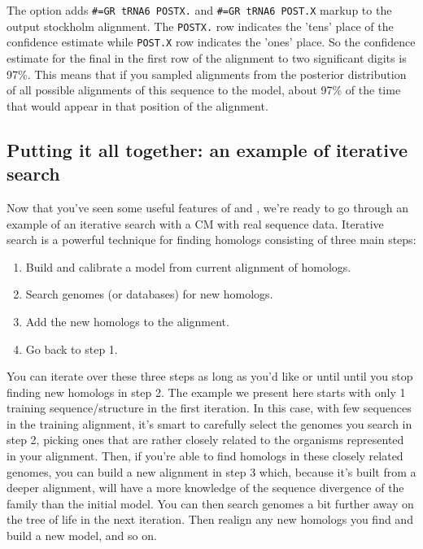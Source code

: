 The  option adds
{\small\verb+#=GR tRNA6 POSTX.+}  and {\small\verb+#=GR tRNA6 POST.X+}
markup to the output stockholm alignment. The {\small\verb+POSTX.+}
row indicates the 'tens' place of the confidence estimate while
{\small\verb+POST.X+} row indicates the 'ones' place. So the confidence
estimate for the final  in the first row of the alignment to
two significant digits is 97\%. This means that if you sampled
alignments from the posterior distribution of all possible alignments
of this sequence to the model, about 97\% of the time that 
would appear in that position of the alignment.

\newpage
\subsection{Putting it all together: an example of iterative search}

Now that you've seen some useful features of  and
, we're ready to go through an example of an iterative
search with a CM with real sequence data. Iterative search is a powerful
technique for finding homologs consisting of three main steps:
\begin{enumerate}
\item
  Build and calibrate a model from current alignment of homologs.
\item 
  Search genomes (or databases) for new homologs.
\item
  Add the new homologs to the alignment.
\item
  Go back to step 1.
\end{enumerate}

You can iterate over these three steps as long as you'd like or until
until you stop finding new homologs in step 2.  The example we present
here starts with only 1 training sequence/structure in the first
iteration. In this case, with few sequences in the training alignment,
it's smart to carefully select the genomes you search in step 2,
picking ones that are rather closely related to the organisms
represented in your alignment. Then, if you're able to find homologs
in these closely related genomes, you can build a new alignment
in step 3 which, because it's built from a deeper alignment, will have
a more knowledge of the sequence divergence of the family than
the initial model. You can then search genomes a bit further away on
the tree of life in the next iteration. Then realign any new homologs
you find and build a new model, and so on. 

